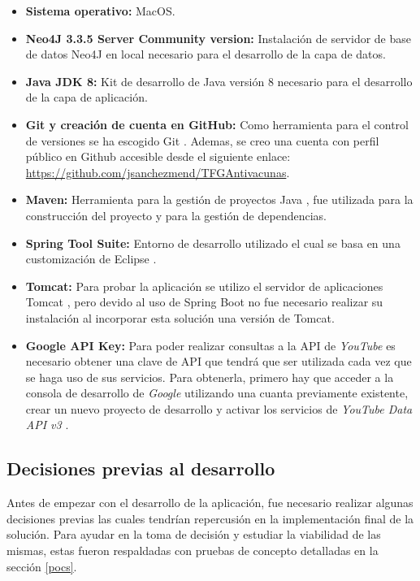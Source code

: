 \documentclass[11pt,a4paper]{article}
\begin{document}
\begin{itemize}
\item \textbf{Sistema operativo:} MacOS.
\item \textbf{Neo4J 3.3.5 Server Community version:} Instalación de servidor de base de datos Neo4J en local necesario para el desarrollo de la capa de datos.
\item \textbf{Java JDK 8:} Kit de desarrollo de Java versión 8 \cite{21} necesario para el desarrollo de la capa de aplicación.
\item \textbf{Git y creación de cuenta en GitHub:} Como herramienta para el control de versiones se ha escogido Git \cite{22}. Ademas, se creo una cuenta con perfil público en Github accesible desde el siguiente enlace: \url{https://github.com/jsanchezmend/TFGAntivacunas}.
\item \textbf{Maven:} Herramienta para la gestión de proyectos Java \cite{23}, fue utilizada para la construcción del proyecto y para la gestión de dependencias.
\item \textbf{Spring Tool Suite:} Entorno de desarrollo utilizado el cual se basa en una customización de Eclipse \cite{24}.
\item \textbf{Tomcat:} Para probar la aplicación se utilizo el servidor de aplicaciones Tomcat \cite{25}, pero devido al uso de Spring Boot \cite{26} no fue necesario realizar su instalación al incorporar esta solución una versión de Tomcat.
\item \textbf{Google API Key:} Para poder realizar consultas a la API de \textit{YouTube} es necesario obtener una clave de API que tendrá que ser utilizada cada vez que se haga uso de sus servicios. Para obtenerla, primero hay que acceder a la consola de desarrollo de \textit{Google} utilizando una cuanta previamente existente, crear un nuevo proyecto de desarrollo y activar los servicios de \textit{YouTube Data API v3} \cite{27}.
\end{itemize}
\medskip 

\subsection{Decisiones previas al desarrollo}
Antes de empezar con el desarrollo de la aplicación, fue necesario realizar algunas decisiones previas las cuales tendrían repercusión en la implementación final de la solución.  Para ayudar en la toma de decisión y estudiar la viabilidad de las mismas, estas fueron respaldadas con pruebas de concepto detalladas en la sección \ref{pocs}.
\\
\end{document}
